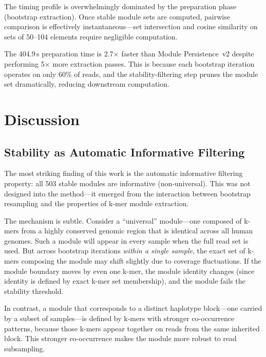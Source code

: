 \documentclass{../yalumba}
\begin{document}
The timing profile is overwhelmingly dominated by the preparation phase
(bootstrap extraction).  Once stable module sets are computed, pairwise
comparison is effectively instantaneous---set intersection and cosine
similarity on sets of 50--104 elements require negligible computation.

The 404.9\,s preparation time is 2.7$\times$ faster than Module Persistence~v2
despite performing 5$\times$ more extraction passes.  This is because each
bootstrap iteration operates on only 60\% of reads, and the stability-filtering
step prunes the module set dramatically, reducing downstream computation.


\section{Discussion}
\label{sec:discussion}

\subsection{Stability as Automatic Informative Filtering}

The most striking finding of this work is the automatic informative filtering
property: all 503 stable modules are informative (non-universal).  This was not
designed into the method---it emerged from the interaction between bootstrap
resampling and the properties of k-mer module extraction.


The mechanism is subtle.  Consider a ``universal'' module---one composed of
k-mers from a highly conserved genomic region that is identical across all
human genomes.  Such a module will appear in every sample when the full read
set is used.  But across bootstrap iterations \emph{within a single sample},
the exact set of k-mers composing the module may shift slightly due to coverage
fluctuations.  If the module boundary moves by even one k-mer, the module
identity changes (since identity is defined by exact k-mer set membership),
and the module fails the stability threshold.

In contrast, a module that corresponds to a distinct haplotype block---one
carried by a subset of samples---is defined by k-mers with stronger
co-occurrence patterns, because those k-mers appear together on reads from the
same inherited block.  This stronger co-occurrence makes the module more
robust to read subsampling.
\end{document}
